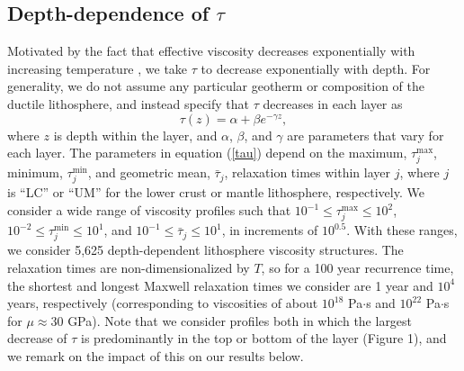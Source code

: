 \subsection{Depth-dependence of $\tau$}
Motivated by the fact that effective viscosity decreases exponentially
with increasing temperature \citep[e.g.,][]{Kohlstedt1995}, we take
$\tau$ to decrease exponentially with depth. For generality, we do not
assume any particular geotherm or composition of the ductile
lithosphere, and instead specify that $\tau$ decreases in each layer
as
\begin{equation}
\tau(z) = \alpha + \beta e^{-\gamma z},
\label{tau}
\end{equation}
where $z$ is depth within the layer, and $\alpha$, $\beta$, and
$\gamma$ are parameters that vary for each layer.  The parameters in
equation (\ref{tau}) depend on the maximum, $\tau_j^{\max}$, minimum,
$\tau_j^{\min}$, and geometric mean, $\bar{\tau}_j$, relaxation times
within layer $j$, where $j$ is ``LC'' or ``UM'' for the lower crust or
mantle lithosphere, respectively.  We consider a wide range of
viscosity profiles such that $10^{-1} \leq \tau_j^{\max} \leq 10^{2}$,
$10^{-2} \leq \tau_j^{\min} \leq 10^{1}$, and $10^{-1} \leq
\bar{\tau}_j \leq 10^{1}$, in increments of $10^{0.5}$.  With these
ranges, we consider 5,625 depth-dependent lithosphere viscosity
structures. The relaxation times are non-dimensionalized by $T$, so
for a 100 year recurrence time, the shortest and longest Maxwell
relaxation times we consider are 1 year and $10^{4}$ years,
respectively (corresponding to viscosities of about $10^{18}$
Pa$\cdot$s and $10^{22}$ Pa$\cdot$s for $\mu \approx 30$ GPa).  Note
that we consider profiles both in which the largest decrease of $\tau$
is predominantly in the top or bottom of the layer (Figure 1), and we
remark on the impact of this on our results below.


